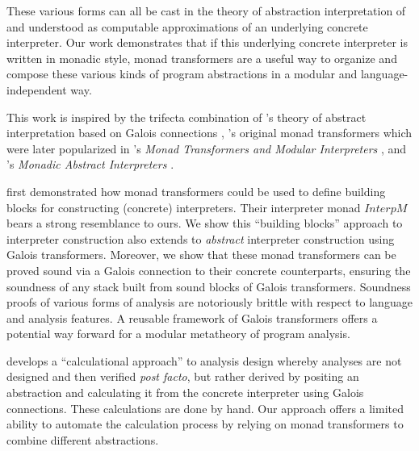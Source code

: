 \par

These various forms can all be cast in the theory of abstraction
interpretation of \citet{dvanhorn:Cousot:1977:AI,
dvanhorn:Cousot1979Systematic} and understood as computable
approximations of an underlying concrete interpreter. Our work
demonstrates that if this underlying concrete interpreter is written in
monadic style, monad transformers are a useful way to organize and
compose these various kinds of program abstractions in a modular and
language-independent way.

\par

This work is inspired by the trifecta combination of
\citeauthor{dvanhorn:Cousot:1977:AI}'s theory of abstract interpretation
based on Galois connections \cite{dvanhorn:Cousot:1977:AI,
dvanhorn:Cousot1979Systematic, dvanhorn:Cousot98-5},
\citeauthor{davdar:Moggi:1989:Monads}'s original monad transformers
\cite{davdar:Moggi:1989:Monads} which were later popularized in
\citeauthor{dvanhorn:Liang1995Monad}'s \emph{Monad Transformers and
Modular Interpreters} \cite{dvanhorn:Liang1995Monad}, and
\citeauthor{dvanhorn:Sergey2013Monadic}'s \emph{Monadic Abstract
Interpreters} \cite{dvanhorn:Sergey2013Monadic}.

\par

\par

\citet{dvanhorn:Liang1995Monad} first demonstrated how monad
transformers could be used to define building blocks for constructing
(concrete) interpreters. Their interpreter monad
\mbox{\(\mathit{InterpM}\)} bears a strong resemblance to ours. We show
this ``building blocks'' approach to interpreter construction also
extends to \emph{abstract} interpreter construction using Galois
transformers. Moreover, we show that these monad transformers can be
proved sound via a Galois connection to their concrete counterparts,
ensuring the soundness of any stack built from sound blocks of Galois
transformers. Soundness proofs of various forms of analysis are
notoriously brittle with respect to language and analysis features. A
reusable framework of Galois transformers offers a potential way forward
for a modular metatheory of program analysis.

\par

\citet{dvanhorn:Cousot98-5} develops a ``calculational approach'' to
analysis design whereby analyses are not designed and then verified
\emph{post facto}, but rather derived by positing an abstraction and
calculating it from the concrete interpreter using Galois connections.
These calculations are done by hand. Our approach offers a limited
ability to automate the calculation process by relying on monad
transformers to combine different abstractions.

